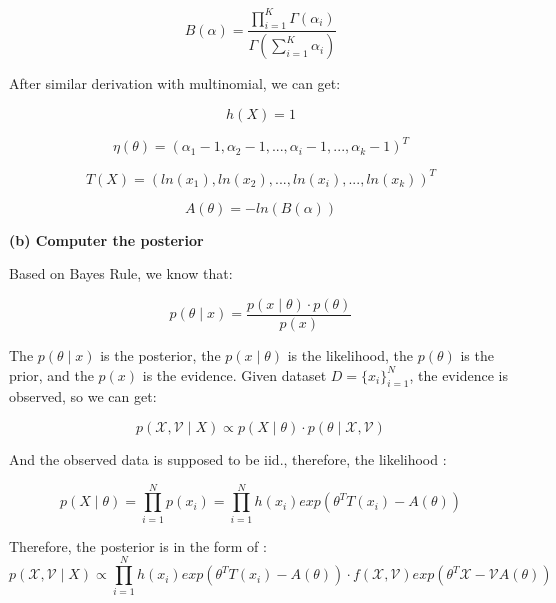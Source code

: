 \documentclass{article} %
\begin{document}
\begin{equation}
B( \alpha )= \frac{\prod_{i=1}^K \Gamma(\alpha_i)}
{\Gamma (\sum_{i=1}^K \alpha_i)}
\end{equation}

After similar derivation with multinomial, we can get:

\begin{equation}
h(X)  = 1
\end{equation}

\begin{equation}
\eta( \theta ) = (\alpha_1 - 1, \alpha_2 - 1, ..., \alpha_i - 1, ..., \alpha_k -
1)^T
\end{equation}

\begin{equation}
T(X)  = (ln(x_1), ln(x_2), ..., ln(x_i), ..., ln(x_k))^T
\end{equation}

\begin{equation}
A(\theta) = - ln(B(\alpha))
\end{equation}


\textbf{(b) Computer the posterior}

Based on Bayes Rule, we know that:

\begin{equation}
p(\theta \mid x)  = \frac{p(x \mid \theta) \cdot p(\theta)}{p(x)}
\end{equation}

The $p(\theta \mid x)$ is the posterior, the $p(x \mid \theta)$ is the likelihood,
the $p(\theta)$ is the prior, and the $p(x)$ is the evidence. Given dataset
$D = \{ x_i \}_{i=1}^N$, the evidence is observed, so we can get:

\begin{equation}
p(\mathcal{X, V} \mid X) \propto p(X \mid \theta) \cdot p(\theta \mid
\mathcal{X, V})
\end{equation}

And the observed data is supposed to be iid., therefore, the likelihood :

\begin{equation}
p(X \mid \theta) = \prod_{i=1}^N p(x_i) = \prod_{i=1}^N h(x_i) exp( \theta^T
T(x_i) - A(\theta))
\end{equation}

Therefore, the posterior is in the form of :
\begin{equation}
p(\mathcal{X, V} \mid X) \propto
\prod_{i=1}^N h(x_i) exp( \theta^T T(x_i) - A(\theta))
\cdot f(\mathcal{X, V}) exp({\theta^T \mathcal{X} - \mathcal{V}A(\theta)})
\end{equation}
\end{document}
